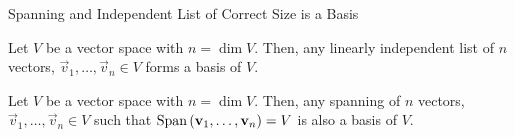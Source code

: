 \documentclass[xcoler=dvipsnames, aspectratio=169]{beamer}
\begin{document}
    \begin{frame}{Spanning and Independent List of Correct Size is a Basis}
        \begin{theorem}
            Let $V$ be a vector space with $n=\dim{V}$. Then, any linearly independent list of 
            $n$ vectors, $\vec{v}_1,\dots,\vec{v}_n\in V$ forms a basis of $V$.
        \end{theorem}\pause\vspace{90pt}
        \begin{theorem}
            Let $V$ be a vector space with $n=\dim{V}$. Then, any spanning of 
            $n$ vectors, $\vec{v}_1,\dots,\vec{v}_n\in V$ such that $\text{Span}\left(\mathbf{v}_1,\dots,\mathbf{v}_n\right) = V$
            is also a basis of $V$.
        \end{theorem}
        \vspace{130pt}
    \end{frame}
\end{document}
